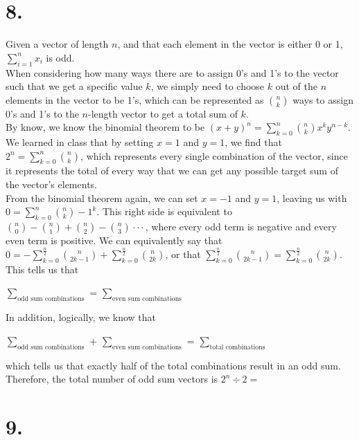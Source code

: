 \documentclass{article}
\begin{document}
\section*{8.}
{\Large 

Given a vector of length $n$, and that each element in the vector is either 0 or 1, $\sum_{i=1}^{n}x_i$ is odd. \\
When considering how many ways there are to assign 0's and 1's to the vector such that we get a specific value $k$, we simply need to choose $k$ out of the $n$ elements in the vector to be 1's, which can be represented as $\binom{n}{k}$ ways to assign 0's and 1's to the $n$-length vector to get a total sum of $k$. \\
By know, we know the binomial theorem to be $(x+y)^n = \sum_{k=0}^{n} \binom{n}{k}x^ky^{n-k}$. We learned in class that by setting $x = 1$ and $y = 1$, we find that $2^n = \sum_{k=0}^{n}\binom{n}{k}$, which represents every single combination of the vector, since it represents the total of every way that we can get any possible target sum of the vector's elements. \\ 
From the binomial theorem again, we can set $x = -1$ and $y = 1$, leaving us with $0 = \sum_{k=0}^{n}\binom{n}{k}-1^k$. This right side is equivalent to $\binom{n}{0} - \binom{n}{1} + \binom{n}{2} - \binom{n}{3} \cdot \cdot \cdot$, where every odd term is negative and every even term is positive. We can equivalently say that $0 = -\sum_{k=0}^{\frac{n}{2}}\binom{n}{2k-1} + \sum_{k=0}^{\frac{n}{2}}\binom{n}{2k}$, or that $\sum_{k=0}^{\frac{n}{2}}\binom{n}{2k-1} = \sum_{k=0}^{\frac{n}{2}}\binom{n}{2k}$. This tells us that 
\begin{center}
$\sum_\text{odd sum combinations}$ = $\sum_\text{even sum combinations}$ \\
\end{center}
In addition, logically, we know that
\begin{center}
$\sum_\text{odd sum combinations}$ + $\sum_\text{even sum combinations}$ = $\sum_\text{total combinations}$ \\
\end{center}
which tells us that exactly half of the total combinations result in an odd sum. Therefore, the total number of odd sum vectors is $2^n \div 2 = $ 

\section*{9.}
{\Large 

}}
\end{document}
